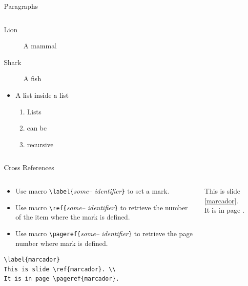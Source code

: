 \documentclass{beamer}
\begin{document}
\begin{frame}[fragile]{Paragraphs}
\begin{columns}
\begin{column}{4cm}
\begin{description}
\item[Lion] A mammal
\item[Shark] A fish
\end{description}
\vspace{0.5cm}
\begin{itemize}
\item A list inside a list
\begin{enumerate}
\item Lists 
\item can be 
\item recursive
\end{enumerate}
\end{itemize}
\end{column}
\end{columns}
\end{frame}

\begin{frame}[fragile]{Cross References}
\begin{columns}
\begin{column}{6cm}
\begin{itemize}
\item Use macro \verb!\label{!\textit{some-- identifier}\verb!}! to set a mark.
\item Use macro \verb!\ref{!\textit{some-- identifier}\verb!}! to retrieve the number of the item where the mark is defined.
\item Use macro \verb!\pageref{!\textit{some-- identifier}\verb!}! to retrieve the page number where mark is defined.
\end{itemize}
\begin{lstlisting}
\label{marcador}
This is slide \ref{marcador}. \\
It is in page \pageref{marcador}.
\end{lstlisting}
\end{column}
\begin{column}{4cm}
\label{marcador}
\begin{center}
This is slide \ref{marcador}. \\
It is in page \pageref{marcador}.
\end{center}
\end{column}
\end{columns}
\end{frame}
\end{document}
